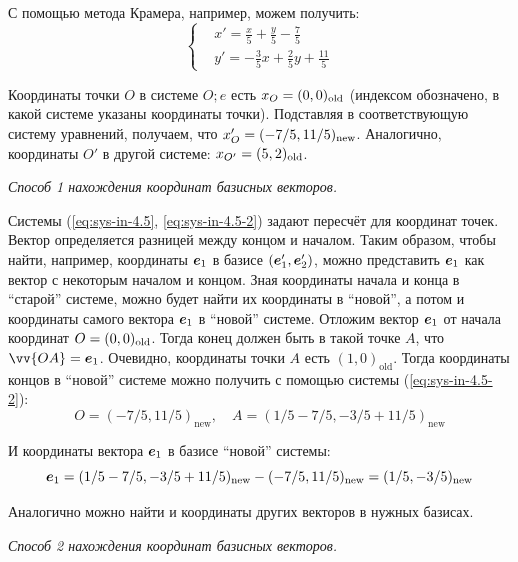 \documentclass[a4paper,12pt]{article}
\begin{document}
  \begin{solution}
    С помощью метода Крамера, например, можем получить:
    \begin{equation}\label{eq:sys-in-4.5-2}
      \left\{
        \begin{aligned}
          &x' = \frac{x}{5} + \frac{y}{5} - \frac{7}{5}\\
          &y' = -\frac{3}{5}x + \frac{2}{5}y + \frac{11}{5}
        \end{aligned}
      \right.
    \end{equation}
    
    Координаты точки $O$ в системе $O; e$ есть $x_O \hm= (0, 0)_{\mathrm{old}}$ (индексом обозначено, в какой системе указаны координаты точки).
    Подставляя в соответствующую систему уравнений, получаем, что $x'_O \hm= (-7/5, 11/5)_{\mathrm{new}}$.
    Аналогично, координаты $O'$ в другой системе: $x_{O'} \hm= (5, 2)_{\mathrm{old}}$.
    
    \bigskip
    
    \emph{Способ 1 нахождения координат базисных векторов.}
    
    Системы (\ref{eq:sys-in-4.5}, \ref{eq:sys-in-4.5-2}) задают пересчёт для координат точек.
    Вектор определяется разницей между концом и началом.
    Таким образом, чтобы найти, например, координаты $\boldsymbol e_1$ в базисе $(\boldsymbol e_1', \boldsymbol e_2')$, можно представить $\boldsymbol e_1$ как вектор с некоторым началом и концом.
    Зная координаты начала и конца в ``старой'' системе, можно будет найти их координаты в ``новой'', а потом и координаты самого вектора $\boldsymbol e_1$ в ``новой'' системе.
    Отложим вектор $\boldsymbol e_1$ от начала координат $O \hm= (0, 0)_{\mathrm{old}}$.
    Тогда конец должен быть в такой точке $A$, что $\vv{OA} \hm= \bds e_1$.
    Очевидно, координаты точки $A$ есть $(1, 0)_{\mathrm{old}}$.
    Тогда координаты концов в ``новой'' системе можно получить с помощью системы (\ref{eq:sys-in-4.5-2}):
    \[
      O = (-7/5, 11/5)_{\mathrm{new}}, \quad A = (1/5 - 7/5, -3/5 + 11/5)_{\mathrm{new}}
    \]
    
    И координаты вектора $\boldsymbol e_1$ в базисе ``новой'' системы:
    \[
      \boldsymbol e_1 = (1/5 - 7/5, -3/5 + 11/5)_{\mathrm{new}} - (-7/5, 11/5)_{\mathrm{new}} = (1/5, -3/5)_{\mathrm{new}}
    \]
    
    Аналогично можно найти и координаты других векторов в нужных базисах.
    
    \medskip
    
    \emph{Способ 2 нахождения координат базисных векторов.}
    

\end{solution}
\end{document}
